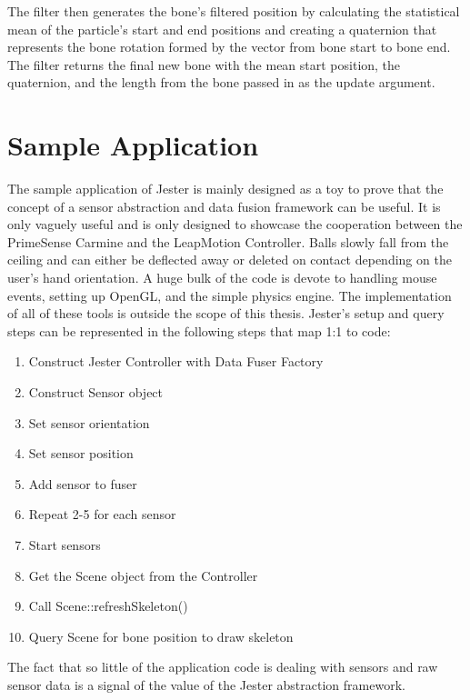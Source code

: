 The filter then generates the bone's filtered position by calculating the statistical mean of the particle's start and end positions and creating a quaternion that represents the bone rotation formed by the vector from bone start to bone end. The filter returns the final new bone with the mean start position, the quaternion, and the length from the bone passed in as the update argument. 

\section{Sample Application}\label{sec:app_impl}

The sample application of Jester is mainly designed as a toy to prove that the concept of a sensor abstraction and data fusion framework can be useful. It is only vaguely useful and is only designed to showcase the cooperation between the PrimeSense Carmine and the LeapMotion Controller. Balls slowly fall from the ceiling and can either be deflected away or deleted on contact depending on the user's hand orientation. A huge bulk of the code is devote to handling mouse events, setting up OpenGL, and the simple physics engine. The implementation of all of these tools is outside the scope of this thesis. Jester's setup and query steps can be represented in the following steps that map 1:1 to code:

\begin{enumerate}
  \item Construct Jester Controller with Data Fuser Factory
  \item Construct Sensor object
  \item Set sensor orientation
  \item Set sensor position
  \item Add sensor to fuser
  \item Repeat 2-5 for each sensor
  \item Start sensors
  \item Get the Scene object from the Controller
  \item Call Scene::refreshSkeleton()
  \item Query Scene for bone position to draw skeleton
\end{enumerate}

The fact that so little of the application code is dealing with sensors and raw sensor data is a signal of the value of the Jester abstraction framework.
